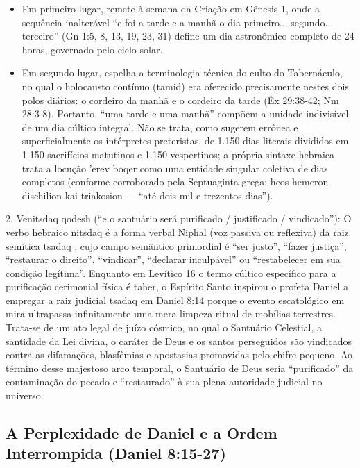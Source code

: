 \begin{itemize}
  \item Em primeiro lugar, remete à semana da Criação em Gênesis 1, onde a sequência inalterável ``e foi a tarde e a manhã o dia primeiro... segundo... terceiro'' (Gn 1:5, 8, 13, 19, 23, 31) define um dia astronômico completo de 24 horas, governado pelo ciclo solar.
  \item Em segundo lugar, espelha a terminologia técnica do culto do Tabernáculo, no qual o holocausto contínuo (tamid) era oferecido precisamente nestes dois polos diários: o cordeiro da manhã e o cordeiro da tarde (Êx 29:38-42; Nm 28:3-8). Portanto, ``uma tarde e uma manhã'' compõem a unidade indivisível de um dia cúltico integral. Não se trata, como sugerem errônea e superficialmente os intérpretes preteristas, de 1.150 dias literais divididos em 1.150 sacrifícios matutinos e 1.150 vespertinos; a própria sintaxe hebraica trata a locução 'erev boqer como uma entidade singular coletiva de dias completos (conforme corroborado pela Septuaginta grega: heos hemeron dischilion kai triakosion — ``até dois mil e trezentos dias'').
\end{itemize}

2. Venitsdaq qodesh (``e o santuário será purificado / justificado / vindicado''): O verbo hebraico nitsdaq é a forma verbal Niphal (voz passiva ou reflexiva) da raiz semítica tsadaq , cujo campo semântico primordial é ``ser justo'', ``fazer justiça'', ``restaurar o direito'', ``vindicar'', ``declarar inculpável'' ou ``restabelecer em sua condição legítima''. Enquanto em Levítico 16 o termo cúltico específico para a purificação cerimonial física é taher, o Espírito Santo inspirou o profeta Daniel a empregar a raiz judicial tsadaq em Daniel 8:14 porque o evento escatológico em mira ultrapassa infinitamente uma mera limpeza ritual de mobílias terrestres. Trata-se de um ato legal de juízo cósmico, no qual o Santuário Celestial, a santidade da Lei divina, o caráter de Deus e os santos perseguidos são vindicados contra as difamações, blasfêmias e apostasias promovidas pelo chifre pequeno. Ao término desse majestoso arco temporal, o Santuário de Deus seria ``purificado'' da contaminação do pecado e ``restaurado'' à sua plena autoridade judicial no universo.



\subsection{A Perplexidade de Daniel e a Ordem Interrompida (Daniel 8:15-27)}


